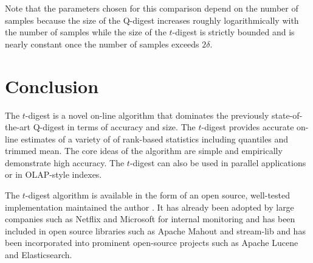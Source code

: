 \documentclass[]{statsoc}
\begin{document}
Note that the parameters chosen for this comparison depend on the number of samples because the size of the Q-digest increases roughly logarithmically with the number of samples while the size of the $t$-digest is strictly bounded and is nearly constant once the number of samples exceeds $2 \delta$. 

\section{Conclusion}
The $t$-digest is a novel on-line algorithm that dominates the previously state-of-the-art Q-digest in terms of accuracy and size.  The $t$-digest provides accurate on-line estimates of a variety of of rank-based statistics including quantiles and trimmed mean.  The core ideas of the algorithm are simple and empirically demonstrate high accuracy.  The $t$-digest can also be used in parallel applications or in OLAP-style indexes.  

The $t$-digest algorithm is available in the form of an open source, well-tested implementation maintained the author \cite{t-digest-project}.  It has already been adopted by large companies such as Netflix and Microsoft for internal monitoring and has been included in open source libraries such as Apache Mahout and stream-lib and has been incorporated into prominent open-source projects such as Apache Lucene and Elasticsearch.



{}
\end{document}
